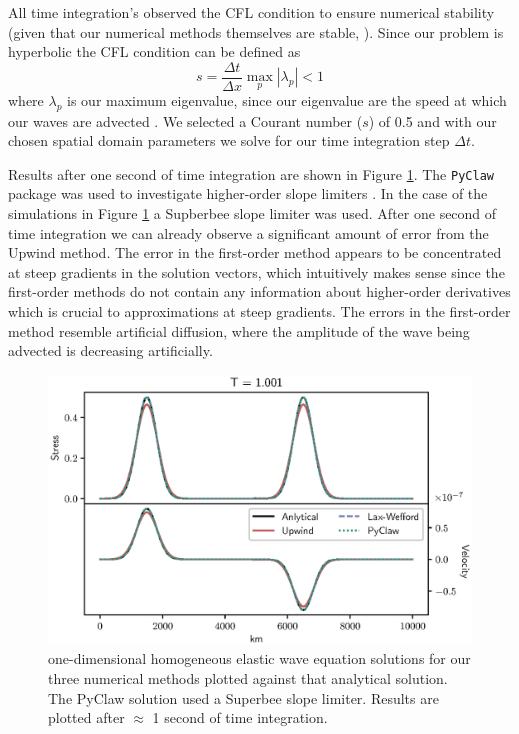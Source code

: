 \documentclass[review,onefignum,onetabnum]{siamart171218}
\begin{document}
All time integration's observed the  CFL condition to ensure numerical stability (given that our numerical methods themselves are stable, \cite{leveque_2002}).  Since our problem is hyperbolic the CFL condition can be defined as 
\begin{equation}
    s = \frac{\Delta t}{\Delta x} \max_p |\lambda_p| < 1
\end{equation}
where $\lambda_p$ is our maximum eigenvalue, since our eigenvalue are the speed at which our waves are advected \cite{leveque_2002}. We selected a Courant number ($s$) of 0.5 and with our chosen spatial domain parameters we solve for our time integration step $\Delta t$.

Results after one second of time integration are shown in Figure \ref{fig:homo1sec}. The \texttt{PyClaw} package was used to investigate higher-order slope limiters \cite{clawpack}. In the case of the simulations in Figure \ref{fig:homo1sec} a Supberbee slope limiter was used. After one second of time integration we can already observe a significant amount of error from the Upwind method. The error in the first-order method appears to be concentrated at steep gradients in the solution vectors, which intuitively makes sense since the first-order methods do not contain any information about higher-order derivatives which is crucial to approximations at steep gradients. The errors in the first-order method resemble artificial diffusion, where the amplitude of the wave being advected is decreasing artificially. 
\begin{figure}
    \centering
    \includegraphics[width=\textwidth]{figs/four_methods.eps}
    \caption{one-dimensional homogeneous elastic wave equation solutions for our three numerical methods plotted against that analytical solution. The PyClaw solution used a Superbee slope limiter. Results are plotted after $\approx$ 1 second of time integration.}
    \label{fig:homo1sec}
\end{figure}
\end{document}
